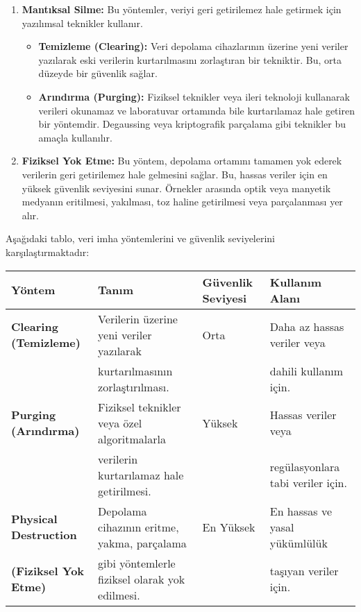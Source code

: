 \begin{enumerate}
    \item \textbf{Mantıksal Silme:} Bu yöntemler, veriyi geri getirilemez hale getirmek için yazılımsal teknikler kullanır.
    \begin{itemize}
        \item \textbf{Temizleme (Clearing):} Veri depolama cihazlarının üzerine yeni veriler yazılarak eski verilerin kurtarılmasını zorlaştıran bir tekniktir. Bu, orta düzeyde bir güvenlik sağlar.
        \item \textbf{Arındırma (Purging):} Fiziksel teknikler veya ileri teknoloji kullanarak verileri okunamaz ve laboratuvar ortamında bile kurtarılamaz hale getiren bir yöntemdir. Degaussing veya kriptografik parçalama gibi teknikler bu amaçla kullanılır.
    \end{itemize}
    \item \textbf{Fiziksel Yok Etme:} Bu yöntem, depolama ortamını tamamen yok ederek verilerin geri getirilemez hale gelmesini sağlar. Bu, hassas veriler için en yüksek güvenlik seviyesini sunar. Örnekler arasında optik veya manyetik medyanın eritilmesi, yakılması, toz haline getirilmesi veya parçalanması yer alır.
\end{enumerate}

Aşağıdaki tablo, veri imha yöntemlerini ve güvenlik seviyelerini karşılaştırmaktadır:

\begin{tabular}{|l|l|l|l|}
\hline
\textbf{Yöntem} & \textbf{Tanım} & \textbf{Güvenlik Seviyesi} & \textbf{Kullanım Alanı} \\
\hline
\textbf{Clearing (Temizleme)} & Verilerin üzerine yeni veriler yazılarak & Orta & Daha az hassas veriler veya \\
& kurtarılmasının zorlaştırılması. & & dahili kullanım için. \\
\hline
\textbf{Purging (Arındırma)} & Fiziksel teknikler veya özel algoritmalarla & Yüksek & Hassas veriler veya \\
& verilerin kurtarılamaz hale getirilmesi. & & regülasyonlara tabi veriler için. \\
\hline
\textbf{Physical Destruction} & Depolama cihazının eritme, yakma, parçalama & En Yüksek & En hassas ve yasal yükümlülük \\
\textbf{(Fiziksel Yok Etme)} & gibi yöntemlerle fiziksel olarak yok edilmesi. & & taşıyan veriler için. \\
\hline
\end{tabular}

